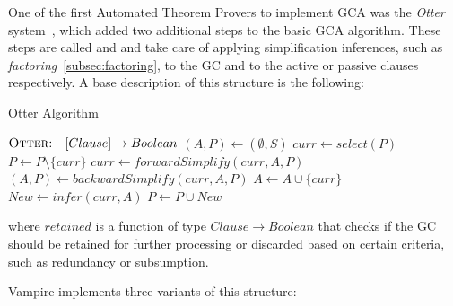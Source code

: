One of the first Automated Theorem Provers to implement GCA was the \emph{Otter} system~\cite{mccune1994otter},  which added two additional steps to the basic GCA algorithm.
These steps are called  and  and take care of applying simplification inferences, such as \emph{factoring}~\ref{subsec:factoring}, to the GC and to the active or passive clauses respectively.
A base description of this structure is the following:
\begin{algorithm}[H]
    \caption{Otter Algorithm}\label{alg:otter-algorithm}
    \begin{algorithmic}[1]
        \Statex{}  \(\textsc{Otter:} \quad [Clause] \to Boolean\)
            \State{} \((A,P)\gets (\emptyset,S)\)
                \State{} \(curr \gets select(P)\)
                \State{} \(P \gets P \setminus \{curr\}\)
                    \State{} \(curr \gets forwardSimplify(curr,A,P)\)
                        \State{} 
                    \EndIf{}
                        \State{} \((A,P) \gets backwardSimplify(curr,A,P)\)
                        \State{} \(A \gets A \cup \{curr\}\)
                        \State{} \(New \gets infer(curr, A)\)
                            \State{} 
                        \EndIf{}
                        \State{} \(P \gets P \cup New\)
                    \EndIf{}
                \EndIf{}
            \EndWhile{}
            \State{} 
        \EndFunction{}
    \end{algorithmic}
\end{algorithm}
where \(retained\) is a function of type \(Clause \to Boolean\) that checks if the GC should be retained for further processing or discarded based on certain criteria, such as redundancy or subsumption.

Vampire implements three variants of this structure:


